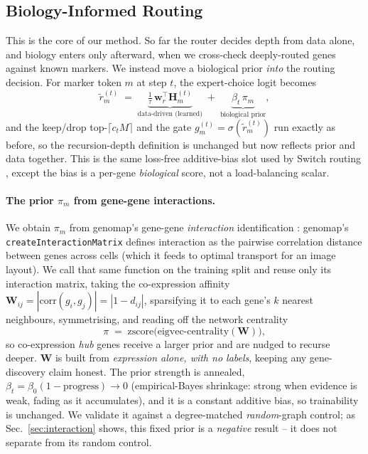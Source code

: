 \documentclass[letterpaper]{article}
\begin{document}
\subsection{Biology-Informed Routing}
\label{sec:biorouter}
This is the core of our method. So far the router decides depth from data alone, and
biology enters only afterward, when we cross-check deeply-routed genes against known
markers. We instead move a biological prior \emph{into} the routing decision. For
marker token $m$ at step $t$, the expert-choice logit becomes
\begin{equation}
\tilde r^{(t)}_m \;=\; \underbrace{\tfrac{1}{\tau}\,\mathbf{w}_r^{\top}\mathbf{H}^{(t)}_m}_{\text{data-driven (learned)}}
\;+\; \underbrace{\beta_t\,\pi_m}_{\text{biological prior}},
\label{eq:biorouter}
\end{equation}
and the keep/drop top-$\lceil c_t M\rceil$ and the gate
$g^{(t)}_m=\sigma(\tilde r^{(t)}_m)$ run exactly as before, so the recursion-depth
definition is unchanged but now reflects prior and data together. This is the same
loss-free additive-bias slot used by Switch routing \cite{shazeer2017outrageously},
except the bias is a per-gene \emph{biological} score, not a load-balancing scalar.

\paragraph{The prior $\pi_m$ from gene-gene interactions.}
We obtain $\pi_m$ from genomap's gene-gene \emph{interaction} identification
\cite{islam2023cartography}: genomap's \texttt{createInteractionMatrix} defines
interaction as the pairwise correlation distance between genes across cells (which it
feeds to optimal transport for an image layout). We call that same function on the
training split and reuse only its interaction matrix, taking the co-expression
affinity $\mathbf{W}_{ij}=|\mathrm{corr}(g_i,g_j)|=|1-d_{ij}|$, sparsifying it to each
gene's $k$ nearest neighbours, symmetrising, and reading off the network centrality
\begin{equation}
\pi \;=\; \mathrm{zscore}\big(\text{eigvec-centrality}(\mathbf{W})\big),
\end{equation}
so co-expression \emph{hub} genes receive a larger prior and are nudged to recurse deeper.
$\mathbf{W}$ is built from \emph{expression alone, with no labels}, keeping any
gene-discovery claim honest. The prior strength is annealed, $\beta_t=\beta_0(1-\text{progress})\!\to\!0$
(empirical-Bayes shrinkage: strong when evidence is weak, fading as it accumulates), and it
is a constant additive bias, so trainability is unchanged. We validate it against a
degree-matched \emph{random}-graph control; as Sec.~\ref{sec:interaction} shows, this fixed
prior is a \emph{negative} result -- it does not separate from its random control.
\end{document}
